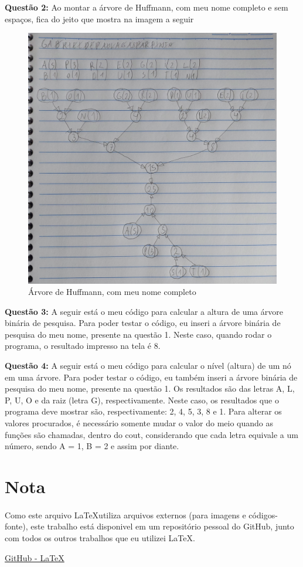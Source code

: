 \documentclass{article}
\begin{document}
\newpage
\textbf{Questão 2:}
Ao montar a árvore de Huffmann, com meu nome completo e sem espaços, fica do jeito que mostra na imagem a seguir

\begin{figure}[h!]
    \centering
    \includegraphics[width=0.5\linewidth]{huffmann.jpg}
    \caption{Árvore de Huffmann, com meu nome completo}
    \label{fig:questao1}
\end{figure}

\textbf{Questão 3:}
A seguir está o meu código para calcular a altura de uma árvore binária de pesquisa. Para poder testar o código, eu inseri a árvore binária de pesquisa do meu nome, presente na questão 1. Neste caso, quando rodar o programa, o resultado impresso na tela é 8.



\newpage
\textbf{Questão 4:}
A seguir está o meu código para calcular o nível (altura) de um nó em uma árvore. Para poder testar o código, eu também inseri a árvore binária de pesquisa do meu nome, presente na questão 1. Os resultados são das letras A, L, P, U, O e da raiz (letra G), respectivamente. Neste caso, os resultados que o programa deve mostrar são, respectivamente: 2, 4, 5, 3, 8 e 1. Para alterar os valores procurados, é necessário somente mudar o valor do meio quando as funções são chamadas, dentro do cout, considerando que cada letra equivale a um número, sendo A = 1, B = 2 e assim por diante.



\section{Nota}
\paragraph{}Como este arquivo \LaTeX  \hspace{1mm}utiliza arquivos externos (para imagens e códigos-fonte), este trabalho está disponivel em um repositório pessoal do GitHub, junto com todos os outros trabalhos que eu utilizei \LaTeX.

\begin{center}
    \href{https://github.com/gpgp2006/LaTeX}{GitHub - \LaTeX}

    
\end{center}
\end{document}
